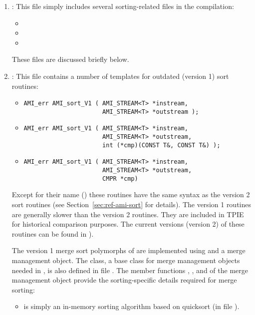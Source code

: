 \begin{enumerate}

    \item {}: This file simply
    includes several sorting-related files in the compilation:
    \begin{itemize}
        \item {}
        \item {}
        \item {}
    \end{itemize}
    \noindent
     These files are discussed briefly below.
     
     \item {}: This file
     contains a number of templates for outdated (version 1)
     sort routines:
    \begin{itemize}
        \item 
\begin{verbatim}
AMI_err AMI_sort_V1 ( AMI_STREAM<T> *instream, 
                      AMI_STREAM<T> *outstream ); 
\end{verbatim}
        \item 
\begin{verbatim}
AMI_err AMI_sort_V1 ( AMI_STREAM<T> *instream, 
                      AMI_STREAM<T> *outstream, 
                      int (*cmp)(CONST T&, CONST T&) );
\end{verbatim}

        \item 
\begin{verbatim}
AMI_err AMI_sort_V1 ( AMI_STREAM<T> *instream, 
                      AMI_STREAM<T> *outstream, 
                      CMPR *cmp)
\end{verbatim}
    \end{itemize}
    Except for their name () these
    routines have the same syntax as the version 2 sort
    routines  (see
    Section~\ref{sec:ref-ami-sort} for details). The version
    1 routines are generally slower than the version 2
    routines. They are included in TPIE for historical
    comparison purposes.
    The current versions (version 2) of these routines can
    be found in ).

    
    The version 1 merge sort polymorphs of
     are implemented using
     and a merge
    management object. The 
    class, a base class for merge management objects needed in
    , is also defined in file
    .  The member functions
    , ,
    and  of the merge management object
    provide the sorting-specific details required for merge
    sorting:
    \begin{itemize}
        \item {} is simply an
        in-memory sorting algorithm based on quicksort (in
        file ).
        

\end{itemize}
\end{enumerate}
